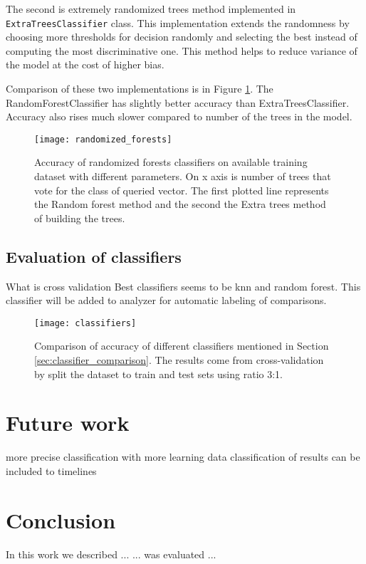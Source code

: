 The second is extremely randomized trees method implemented in
\texttt{ExtraTreesClassifier} class. This implementation extends the randomness
by choosing more thresholds for decision randomly and selecting the best instead
of computing the most discriminative one. This method helps to reduce variance
of the model at the cost of higher bias.

Comparison of these two implementations is in Figure
\ref{fig:randomized_forests}. The RandomForestClassifier has slightly better
accuracy than ExtraTreesClassifier. Accuracy also rises much slower compared to
number of the trees in the model.

\begin{figure}
  \centering
  \texttt{[image: randomized\_forests]}
  \caption{Accuracy of randomized forests classifiers on available training
    dataset with different parameters. On x axis is number of trees that vote
    for the class of queried vector. The first plotted line represents the
    Random forest method and the second the Extra trees method of building the
    trees.}
  \label{fig:randomized_forests}
\end{figure}

\section{Evaluation of classifiers}
What is cross validation
Best classifiers seems to be knn and random forest.
This classifier will be added to analyzer for automatic labeling of comparisons.

\begin{figure}
  \centering
  \texttt{[image: classifiers]}
  \caption{Comparison of accuracy of different classifiers mentioned in Section
    \ref{sec:classifier_comparison}. The results come from cross-validation by
    split the dataset to train and test sets using ratio 3:1.}
  \label{fig:classifiers}
\end{figure}



\chapter{Future work}
more precise classification with more learning data
classification of results can be included to timelines



\chapter{Conclusion}
In this work we described ...
... was evaluated ...

